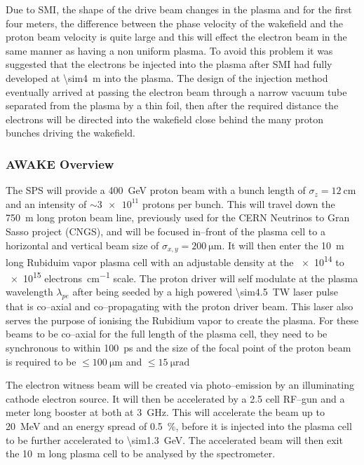 Due to SMI, the shape of the drive beam changes in the plasma and for the first
four meters, the difference between the phase velocity of the wakefield and the
proton beam velocity is quite large and this will effect the electron beam in
the same manner as having a non uniform plasma. To avoid this
problem it was suggested that the electrons be injected into the plasma
after SMI had fully developed at \SI{\sim4}{\meter} into the plasma.
The design of the injection method eventually arrived at
passing the electron beam through a narrow vacuum tube separated from the
plasma by a thin foil, then after the required distance the electrons will be
directed into the wakefield close behind the many proton bunches driving the
wakefield.

\subsubsection{AWAKE Overview}

The SPS will provide a \SI{400}{\giga\electronvolt} proton beam with a bunch
length of \(\sigma_z = \SI{12}{\centi\meter}\) and an intensity of \(\sim
\num{3e11}\) protons per bunch. This will travel down the \SI{750}{\meter} long
proton beam line, previously used for the CERN Neutrinos to Gran Sasso project
(CNGS), and will be focused in--front of the plasma cell to a horizontal and
vertical beam size of \(\sigma_{x,y} = \SI{200}{\micro\meter}\). It will
then enter the \SI{10}{\meter} long Rubiduim vapor plasma cell with an
adjustable density at the \num{e14} to \num{e15} \si{electrons\per\centi\meter}
scale.
The proton driver will self modulate at the plasma wavelength \(\lambda_{pe}\)
after being seeded by a high powered \SI{\sim4.5}{\tera\watt} laser
pulse that is co--axial and co--propagating with the proton driver beam. This
laser also serves the purpose of ionising the Rubidium vapor to create the
plasma. For these beams to be co--axial for the full length of the plasma cell,
they need to be synchronous to within \SI{100}{\pico\second} and the size of the
focal point of the proton beam is required to be \(\le\SI{100}{\micro\meter}\)
and \(\le\SI{15}{\micro\radian}\)

The electron witness beam will be created via photo--emission by an illuminating
cathode electron source. It will then be accelerated by a \num{2.5} cell RF--gun
and a meter long booster at both at \SI{3}{\giga\hertz}.  This will accelerate
the beam up to \SI{20}{\mega\electronvolt} and an energy spread of
\SI{0.5}{\percent}, before it is injected into the plasma cell to be further
accelerated to \SI{\sim1.3}{\giga\electronvolt}.  The accelerated beam will
then exit the \SI{10}{\meter} long plasma cell to be analysed by the
spectrometer.

